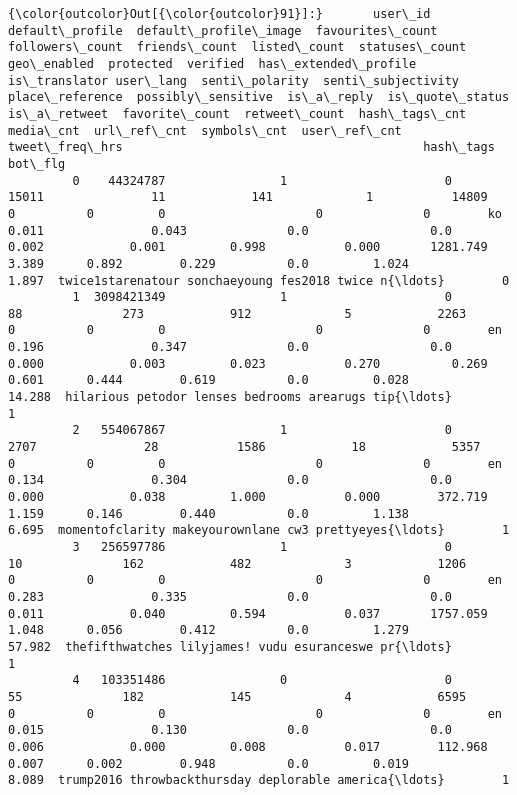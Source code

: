 \documentclass[11pt]{article}
\begin{document}
\begin{Verbatim}[commandchars=\\\{\}]
{\color{outcolor}Out[{\color{outcolor}91}]:}       user\_id  default\_profile  default\_profile\_image  favourites\_count  followers\_count  friends\_count  listed\_count  statuses\_count  geo\_enabled  protected  verified  has\_extended\_profile  is\_translator user\_lang  senti\_polarity  senti\_subjectivity  place\_reference  possibly\_sensitive  is\_a\_reply  is\_quote\_status  is\_a\_retweet  favorite\_count  retweet\_count  hash\_tags\_cnt  media\_cnt  url\_ref\_cnt  symbols\_cnt  user\_ref\_cnt  tweet\_freq\_hrs                                          hash\_tags  bot\_flg
         0    44324787                1                      0             15011               11            141             1           14809            0          0         0                     0              0        ko           0.011               0.043              0.0                 0.0       0.002            0.001         0.998           0.000       1281.749          3.389      0.892        0.229          0.0         1.024           1.897  twice1starenatour sonchaeyoung fes2018 twice n{\ldots}        0
         1  3098421349                1                      0                88              273            912             5            2263            0          0         0                     0              0        en           0.196               0.347              0.0                 0.0       0.000            0.003         0.023           0.270          0.269          0.601      0.444        0.619          0.0         0.028          14.288  hilarious petodor lenses bedrooms arearugs tip{\ldots}        1
         2   554067867                1                      0              2707               28           1586            18            5357            0          0         0                     0              0        en           0.134               0.304              0.0                 0.0       0.000            0.038         1.000           0.000        372.719          1.159      0.146        0.440          0.0         1.138           6.695  momentofclarity makeyourownlane cw3 prettyeyes{\ldots}        1
         3   256597786                1                      0                10              162            482             3            1206            0          0         0                     0              0        en           0.283               0.335              0.0                 0.0       0.011            0.040         0.594           0.037       1757.059          1.048      0.056        0.412          0.0         1.279          57.982  thefifthwatches lilyjames! vudu esuranceswe pr{\ldots}        1
         4   103351486                0                      0                55              182            145             4            6595            0          0         0                     0              0        en           0.015               0.130              0.0                 0.0       0.006            0.000         0.008           0.017        112.968          0.007      0.002        0.948          0.0         0.019           8.089  trump2016 throwbackthursday deplorable america{\ldots}        1
\end{Verbatim}
\end{document}
